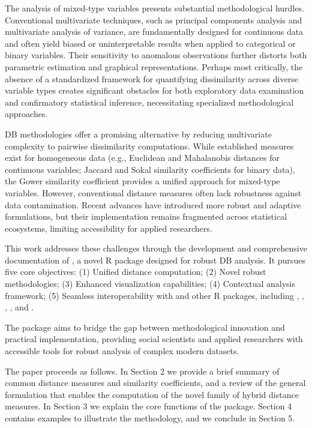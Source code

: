 The analysis of mixed-type variables presents substantial methodological hurdles. Conventional multivariate techniques, such as principal components analysis and multivariate analysis of variance, are fundamentally designed for continuous data and often yield biased or uninterpretable results when applied to categorical or binary variables. Their sensitivity to anomalous observations further distorts both parametric estimation and graphical representations. Perhaps most critically, the absence of a standardized framework for quantifying dissimilarity across diverse variable types creates significant obstacles for both exploratory data examination and confirmatory statistical inference, necessitating specialized methodological approaches.

DB methodologies offer a promising alternative by reducing multivariate complexity to pairwise dissimilarity computations. While established measures exist for homogeneous data (e.g., Euclidean and Mahalanobis distances for continuous variables; Jaccard and Sokal similarity coefficients for binary data), the Gower similarity coefficient provides a unified approach for mixed-type variables. However, conventional distance measures often lack robustness against data contamination. Recent advances have introduced more robust and adaptive formulations, but their implementation remains fragmented across statistical ecosystems, limiting accessibility for applied researchers.

This work addresses these challenges through the development and comprehensive documentation of  \citep{dbrobust}, a novel R package \citep{R} designed for robust DB analysis. It pursues five core objectives: (1) Unified distance computation; (2) Novel robust methodologies; (3) Enhanced visualization capabilities; (4) Contextual analysis framework; (5) Seamless interoperability with  \citep{dbstats} and other R packages, including  \citep{vegan},  \citep{clusterpackage},  \citep{proxy},  \citep{qgraph}, and  \citep{ggplot2}.

The  package aims to bridge the gap between methodological innovation and practical implementation, providing social scientists and applied researchers with accessible tools for robust analysis of complex modern datasets.

The paper proceeds as follows. In Section 2
we provide a brief summary of common distance measures and similarity coefficients, and a review of the general formulation that enables the computation of the novel family of hybrid distance measures. In Section 3
we explain the core functions of the  package. Section 4
contains examples to illustrate the methodology, and we conclude in Section 5.

